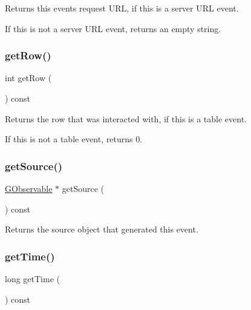 Returns this event\textquotesingle{}s request U\+RL, if this is a server U\+RL event. 

If this is not a server U\+RL event, returns an empty string. \mbox{\label{classGEvent_aa7d942808111bd8f4a3ec1cfcf33c6af}} 
\subsubsection{\texorpdfstring{get\+Row()}{getRow()}}
{\footnotesize\ttfamily int get\+Row (\begin{DoxyParamCaption}{ }\end{DoxyParamCaption}) const\hspace{0.3cm}{\ttfamily [virtual]}}



Returns the row that was interacted with, if this is a table event. 

If this is not a table event, returns 0. \mbox{\label{classGEvent_a6a534b750e8678439ebfbeda4b2e4b26}} 
\subsubsection{\texorpdfstring{get\+Source()}{getSource()}}
{\footnotesize\ttfamily \mbox{\hyperlink{classGObservable}{G\+Observable}} $\ast$ get\+Source (\begin{DoxyParamCaption}{ }\end{DoxyParamCaption}) const\hspace{0.3cm}{\ttfamily [virtual]}}



Returns the source object that generated this event. 

\mbox{\label{classGEvent_a33358fd133be1650e22dbe230748b417}} 
\subsubsection{\texorpdfstring{get\+Time()}{getTime()}}
{\footnotesize\ttfamily long get\+Time (\begin{DoxyParamCaption}{ }\end{DoxyParamCaption}) const\hspace{0.3cm}{\ttfamily [virtual]}}



